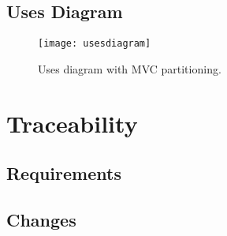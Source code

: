 \documentclass[12pt, titlepage]{article}
\begin{document}
\subsection{Uses Diagram}
\begin{figure}[hB]
\begin{center}
\texttt{[image: usesdiagram]}
\caption{Uses diagram with MVC partitioning.} \label{fig:room}
\end{center}
\end{figure}

\section{Traceability}
\subsection{Requirements}
\subsection{Changes}
\end{document}
